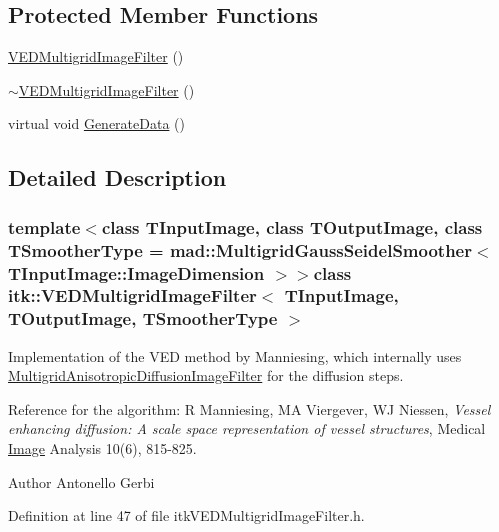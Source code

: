 \subsection*{Protected Member Functions}
\begin{DoxyCompactItemize}
\item 
\hyperlink{classitk_1_1_v_e_d_multigrid_image_filter_a5d015ab30d15fe78c39e532ec69188d9}{V\-E\-D\-Multigrid\-Image\-Filter} ()
\item 
\hyperlink{classitk_1_1_v_e_d_multigrid_image_filter_ac614b2d03c2ce4f6f7403f6459926386}{$\sim$\-V\-E\-D\-Multigrid\-Image\-Filter} ()
\item 
virtual void \hyperlink{classitk_1_1_v_e_d_multigrid_image_filter_a90c199154c057be714f541c2cdd4c3f2}{Generate\-Data} ()
\end{DoxyCompactItemize}


\subsection{Detailed Description}
\subsubsection*{template$<$class T\-Input\-Image, class T\-Output\-Image, class T\-Smoother\-Type = mad\-::\-Multigrid\-Gauss\-Seidel\-Smoother$<$ T\-Input\-Image\-::\-Image\-Dimension $>$$>$class itk\-::\-V\-E\-D\-Multigrid\-Image\-Filter$<$ T\-Input\-Image, T\-Output\-Image, T\-Smoother\-Type $>$}

Implementation of the V\-E\-D method by Manniesing, which internally uses \hyperlink{classitk_1_1_multigrid_anisotropic_diffusion_image_filter}{Multigrid\-Anisotropic\-Diffusion\-Image\-Filter} for the diffusion steps. 

Reference for the algorithm\-: R Manniesing, M\-A Viergever, W\-J Niessen, {\itshape Vessel enhancing diffusion\-: A scale space representation of vessel structures}, Medical \hyperlink{class_image}{Image} Analysis 10(6), 815-\/825.

\begin{DoxyAuthor}{Author}
Antonello Gerbi 
\end{DoxyAuthor}


Definition at line 47 of file itk\-V\-E\-D\-Multigrid\-Image\-Filter.\-h.



